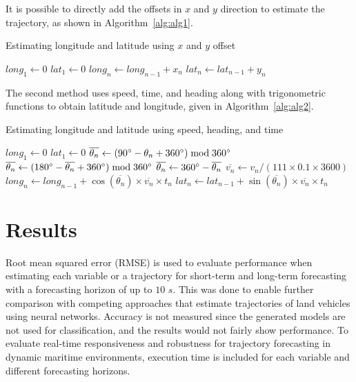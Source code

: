 \documentclass[preprint,12pt]{elsarticle}
\begin{document}
It is possible to directly add the offsets in $x$ and $y$ direction to estimate the trajectory, as shown in Algorithm~\ref{alg:alg1}.

\begin{algorithm}[H] 
\caption{Estimating longitude and latitude using $x$ and $y$ offset}\label{alg:alg1}
\begin{algorithmic} 
\STATE $long_{1} \gets 0$
\STATE $lat_{1} \gets 0$ 
\STATE $long_{n} \gets long_{n-1} + x_{n}$ 
\STATE $lat_{n} \gets lat_{n-1} + y_{n}$ 
\ENDFOR
\end{algorithmic}
\end{algorithm}
 
The second method uses speed, time, and heading along with trigonometric functions to obtain latitude and longitude, given in Algorithm~\ref{alg:alg2}.
 
\begin{algorithm}[H] 
\caption{Estimating longitude and latitude using speed, heading, and time}\label{alg:alg2}
\begin{algorithmic} 
\STATE $long_{1} \gets 0$
\STATE $lat_{1} \gets 0$
\STATE $\overline{\theta_{n}} \gets (90\degree - \theta_{n} + 360\degree) \bmod 360\degree$ 
 \STATE $\overline{\theta_{n}} \gets (180\degree - \overline{\theta_{n}} + 360\degree) \bmod 360\degree$  \ENDIF 
{} \STATE $\overline{\theta_{n}} \gets 360\degree - \overline{\theta_{n}}$ \ENDIF 
\STATE $\overline{v_{n}} \gets v_{n} / (111 \times 0.1 \times 3600)$
\STATE $long_{n} \gets long_{n-1} + \cos{\left(\overline{\theta_{n}}\right)} \times \overline{v_{n}} \times t_{n}$ 
\STATE $lat_{n} \gets lat_{n-1} + \sin{\left(\overline{\theta_{n}}\right)} \times \overline{v_{n}} \times t_{n}$ 
\ENDFOR
\end{algorithmic}
\end{algorithm}


\section{Results}
\label{sec:Results}

Root mean squared error (RMSE) is used to evaluate performance when estimating each variable or a trajectory for short-term and long-term forecasting with a forecasting horizon of up to $10$ $s$. This was done to enable further comparison with competing approaches that estimate trajectories of land vehicles using neural networks. Accuracy is not measured since the generated models are not used for classification, and the results would not fairly show performance. To evaluate real-time responsiveness and robustness for trajectory forecasting in dynamic maritime environments, execution time is included for each variable and different forecasting horizons.
\end{document}

